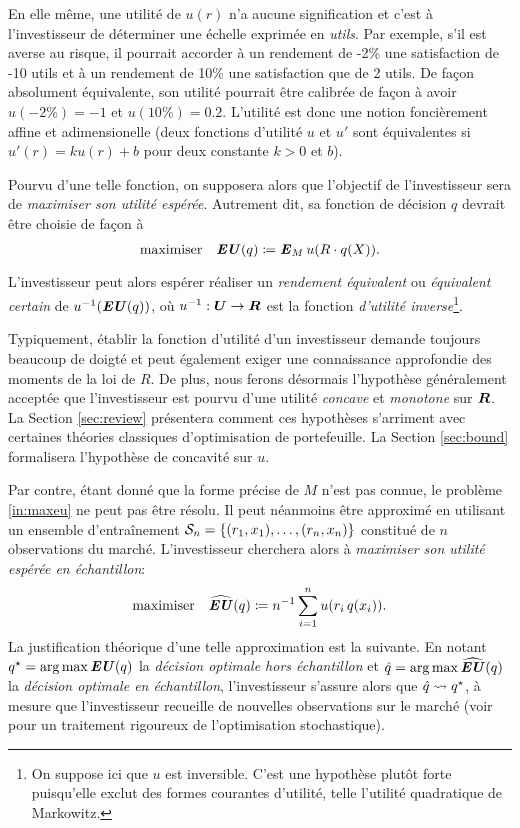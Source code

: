 En elle même, une utilité de $u(r)$ n'a aucune signification et c'est à l'investisseur de
déterminer une échelle exprimée en \textit{utils}. Par exemple, s'il est averse au risque,
il pourrait accorder à un rendement de -2\% une satisfaction de -10 utils et à un
rendement de 10\% une satisfaction que de 2 utils. De façon absolument équivalente, son
utilité pourrait être calibrée de façon à avoir $u(-2\%) = -1$ et $u(10\%) =
0.2$. L'utilité est donc une notion foncièrement affine et adimensionelle (deux fonctions
d'utilité $u$ et $u'$ sont équivalentes si $u'(r) = ku(r) + b$ pour deux constante $k>0$
et $b$).

Pourvu d'une telle fonction, on supposera alors que l'objectif de l'investisseur sera de
\textit{maximiser son utilité espérée}. Autrement dit, sa fonction de décision $q$ devrait
être choisie de façon à
\begin{equation}
  \label{in:maxeu}
  \maximizeEquation{\EU(q) \coloneq \E_M u(R\cdot q(X)).}
\end{equation}
L'investisseur peut alors espérer réaliser un \textit{rendement équivalent} ou
\textit{équivalent certain} de $u^{-1}(\EU(q))$, où $u^{-1}:\Ut \to \R$ est la fonction
\textit{d'utilité inverse}\footnote{On suppose ici que $u$ est inversible. C'est une
  hypothèse plutôt forte puisqu'elle exclut des formes courantes d'utilité, telle
  l'utilité quadratique de Markowitz.}.

Typiquement, établir la fonction d'utilité d'un investisseur demande toujours beaucoup de
doigté et peut également exiger une connaissance approfondie des moments de la loi de
$R$. De plus, nous ferons désormais l'hypothèse généralement acceptée que l'investisseur
est pourvu d'une utilité \textit{concave} et \textit{monotone} sur $\R$. La Section
\ref{sec:review} présentera comment ces hypothèses s'arriment avec certaines théories
classiques d'optimisation de portefeuille. La Section \ref{sec:bound} formalisera
l'hypothèse de concavité sur $u$. 

Par contre, étant donné que la forme précise de $M$ n'est pas connue, le problème
\eqref{in:maxeu} ne peut pas être résolu. Il peut néanmoins être approximé en utilisant un
ensemble d'entraînement $\S_n = \{(r_1,x_1),\ldots,(r_n,x_n)\}$ constitué de $n$
observations du marché. L'investisseur cherchera alors à \textit{maximiser son utilité
  espérée en échantillon}:
\begin{equation}
  \maximizeEquation{\hEU(q) \coloneqq n^{-1} \sumi u(r_i\,q(x_i)).}
\end{equation}
La justification théorique d'une telle approximation est la suivante. En notant
$q^\star = \argmax\EU(q)$ la \textit{décision optimale hors échantillon} et
$\qh = \argmax\hEU(q)$ la \textit{décision optimale en échantillon}, l'investisseur
s'assure alors que $\qh \leadsto q^\star$, à mesure que l'investisseur recueille de nouvelles
observations sur le marché (voir \cite{shapiro2009lectures} pour un traitement rigoureux
de l'optimisation stochastique).


